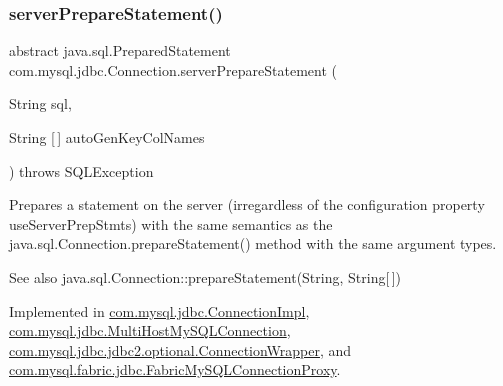 \subsubsection{\texorpdfstring{server\+Prepare\+Statement()}{serverPrepareStatement()}\hspace{0.1cm}{\footnotesize\ttfamily [6/6]}}
{\footnotesize\ttfamily abstract java.\+sql.\+Prepared\+Statement com.\+mysql.\+jdbc.\+Connection.\+server\+Prepare\+Statement (\begin{DoxyParamCaption}\item[{String}]{sql,  }\item[{String \mbox{[}$\,$\mbox{]}}]{auto\+Gen\+Key\+Col\+Names }\end{DoxyParamCaption}) throws S\+Q\+L\+Exception\hspace{0.3cm}{\ttfamily [abstract]}}

Prepares a statement on the server (irregardless of the configuration property \textquotesingle{}use\+Server\+Prep\+Stmts\textquotesingle{}) with the same semantics as the java.\+sql.\+Connection.\+prepare\+Statement() method with the same argument types.

\begin{DoxySeeAlso}{See also}
java.\+sql.\+Connection\+::prepare\+Statement(\+String, String\mbox{[}$\,$\mbox{]}) 
\end{DoxySeeAlso}


Implemented in \mbox{\hyperlink{classcom_1_1mysql_1_1jdbc_1_1_connection_impl_a8bfab236948ec5c7432306cf7eebfd12}{com.\+mysql.\+jdbc.\+Connection\+Impl}}, \mbox{\hyperlink{classcom_1_1mysql_1_1jdbc_1_1_multi_host_my_s_q_l_connection_a406fc0eb56f50ed44dc36158ab45e8d0}{com.\+mysql.\+jdbc.\+Multi\+Host\+My\+S\+Q\+L\+Connection}}, \mbox{\hyperlink{classcom_1_1mysql_1_1jdbc_1_1jdbc2_1_1optional_1_1_connection_wrapper_ab46a28f09e096cc8901db389bc4e6016}{com.\+mysql.\+jdbc.\+jdbc2.\+optional.\+Connection\+Wrapper}}, and \mbox{\hyperlink{classcom_1_1mysql_1_1fabric_1_1jdbc_1_1_fabric_my_s_q_l_connection_proxy_a128a3b2a89feb4f14eabd24a9d7e7835}{com.\+mysql.\+fabric.\+jdbc.\+Fabric\+My\+S\+Q\+L\+Connection\+Proxy}}.

\mbox{\label{interfacecom_1_1mysql_1_1jdbc_1_1_connection_af1a58f95720963635270b83f16d558b0}} 
